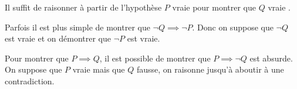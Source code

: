 \begin{definition}
	Il suffit de raisonner à partir de l'hypothèse \og $P$ vraie \fg pour montrer que \og $Q$ vraie \fg . 
\end{definition}

\begin{definition}
	Parfois il est plus simple de montrer que $\neg Q \implies \neg P$.
	Donc on suppose que $\neg Q$ est vraie et on démontrer que $\neg P$ est vraie.
\end{definition}

\begin{definition}
	Pour montrer que $P \implies Q$, il est possible de montrer que $P \implies \neg Q$ est absurde.
	\\
	On suppose que $P$ vraie mais que $Q$ fausse, on raisonne jusqu'à aboutir à une contradiction.
\end{definition}